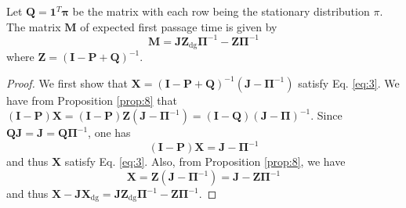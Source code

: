 \begin{proposition}
  \label{prop:5}
  Let $\bm{Q} = \bm{1}^{T}\bm{\pi}$ be the matrix with each row being
  the stationary distribution $\pi$. The matrix $\bm{M}$ of expected
  first passage time is given by
  \begin{equation}
    \label{eq:21}
    \bm{M} = \bm{J}\bm{Z}_{\mathrm{dg}} \bm{\Pi}^{-1} - \bm{Z}
    \bm{\Pi}^{-1}
  \end{equation}
  where $\bm{Z} = (\bm{I} - \bm{P} + \bm{Q})^{-1}$. 
\end{proposition}
\begin{proof}
  We first show that $\bm{X} = (\bm{I} - \bm{P} + \bm{Q})^{-1}(\bm{J}
  - \bm{\Pi}^{-1})$ satisfy Eq. \eqref{eq:3}. We have from Proposition
  \ref{prop:8} that $(\bm{I} - \bm{P})\bm{X} = (\bm{I} -
  \bm{P})\bm{Z}(\bm{J} - \bm{\Pi}^{-1}) = (\bm{I} - \bm{Q})(\bm{J} -
  \bm{\Pi})^{-1}$. Since
  $\bm{Q}\bm{J} = \bm{J} = \bm{Q}\bm{\Pi}^{-1}$, one has
  \begin{equation}
    \label{eq:27}
    (\bm{I} - \bm{P})\bm{X} = \bm{J} - \bm{\Pi}^{-1}
  \end{equation}
  and thus $\bm{X}$ satisfy Eq. \eqref{eq:3}. Also, from Proposition
  \ref{prop:8}, we have
  \begin{equation}
    \label{eq:31}
    \bm{X} = \bm{Z}(\bm{J} - \bm{\Pi}^{-1}) = \bm{J} -
    \bm{Z}\bm{\Pi}^{-1}
  \end{equation}
  and thus $\bm{X} - \bm{J}\bm{X}_{\mathrm{dg}} =
  \bm{J}\bm{Z}_{\mathrm{dg}} \bm{\Pi}^{-1} - \bm{Z}\bm{\Pi}^{-1}$. 
\end{proof}

